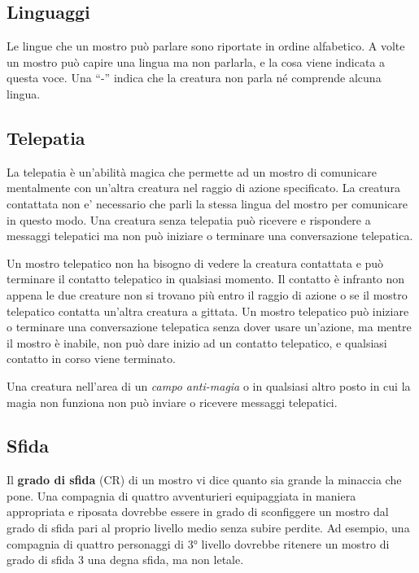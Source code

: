 \begin{multicols}{2}
\subsection{Linguaggi}

Le lingue che un mostro può parlare sono riportate in ordine alfabetico. A volte un mostro può capire una lingua ma non parlarla, e la cosa viene indicata a questa voce. Una ``-'' indica che la creatura non parla né comprende alcuna lingua.

\subsection{Telepatia}

La telepatia è un'abilità magica che permette ad un mostro di comunicare mentalmente con un'altra creatura nel raggio di azione specificato. La creatura contattata non e' necessario che parli la stessa lingua del mostro per comunicare in questo modo. Una creatura senza telepatia può ricevere e rispondere a messaggi telepatici ma non può iniziare o terminare una conversazione telepatica.

Un mostro telepatico non ha bisogno di vedere la creatura contattata e può terminare il contatto telepatico in qualsiasi momento. Il contatto è infranto non appena le due creature non si trovano più entro il raggio di azione o se il mostro telepatico contatta un'altra creatura a gittata. Un mostro telepatico può iniziare o terminare una conversazione  telepatica senza dover usare un'azione, ma mentre il mostro è inabile, non può dare inizio ad un contatto telepatico, e qualsiasi contatto in corso viene terminato.

Una creatura nell'area di un \emph{campo anti-magia} o in qualsiasi altro posto in cui la magia non funziona non può inviare o ricevere messaggi telepatici.

\subsection{Sfida}

Il \textbf{grado di sfida} (CR) di un mostro vi dice quanto sia grande la minaccia che pone. Una compagnia di quattro avventurieri equipaggiata in maniera appropriata e riposata dovrebbe essere in grado di sconfiggere un mostro dal grado di sfida pari al proprio livello medio senza subire perdite. Ad esempio, una compagnia di quattro personaggi di 3° livello dovrebbe ritenere un mostro di grado di sfida 3 una degna sfida, ma non letale.


\end{multicols}
